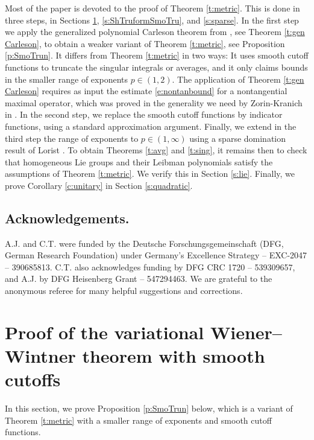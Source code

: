 \documentclass[12pt,reqno,a4paper,dvipsnames]{amsart}
\theoremstyle{plain}
\theoremstyle{definition}
\numberwithin{theorem}{section}
\numberwithin{equation}{section}
\begin{document}
Most of the paper is devoted to the proof of Theorem \ref{t:metric}. This is done in three steps, in Sections \ref{s:SmoTrun}, \ref{s:ShTruformSmoTru}, and \ref{s:sparse}. In the first step we apply the generalized polynomial Carleson theorem from \cite{beckeretal}, see Theorem \ref{t:gen Carleson}, to obtain a weaker variant of Theorem \ref{t:metric}, see Proposition \ref{p:SmoTrun}. It differs from Theorem \ref{t:metric} in two ways: It uses smooth cutoff functions to truncate the singular integrals or averages, and it only claims bounds in the smaller range of exponents $p \in (1,2)$. The application of Theorem \ref{t:gen Carleson} requires as input the estimate \eqref{e:nontanbound} for a  nontangential maximal operator, which was proved in the generality we need by Zorin-Kranich in \cite{zk-var-trunc}. In the second step, we replace the smooth cutoff functions by indicator functions,
using a standard approximation argument. Finally, we extend in the third step the range of exponents to $p \in (1, \infty)$ using a sparse domination result of Lorist \cite{Lorist2021}. To obtain Theorems \ref{t:avg} and \ref{t:sing}, it remains then to check that homogeneous Lie groups and their Leibman polynomials satisfy the assumptions of Theorem \ref{t:metric}. We verify this in Section \ref{s:lie}. 
Finally, we prove Corollary \ref{c:unitary} in Section \ref{s:quadratic}.    

\subsection*{Acknowledgements.}  A.J. and C.T. were funded by the Deutsche Forschungsgemeinschaft (DFG, German Research Foundation) under Germany's Excellence Strategy -- EXC-2047 -- 390685813. C.T. also  acknowledges funding by DFG CRC 1720 -- 539309657, and A.J. by DFG Heisenberg Grant -- 547294463. We are grateful to the anonymous referee for many helpful suggestions and corrections. 



\section{Proof of the variational Wiener--Wintner theorem with smooth cutoffs}
\label{s:SmoTrun}

In this section, we prove Proposition \ref{p:SmoTrun} below, which is a variant of Theorem  \ref{t:metric} with a smaller range of exponents and smooth cutoff functions. 
\end{document}
